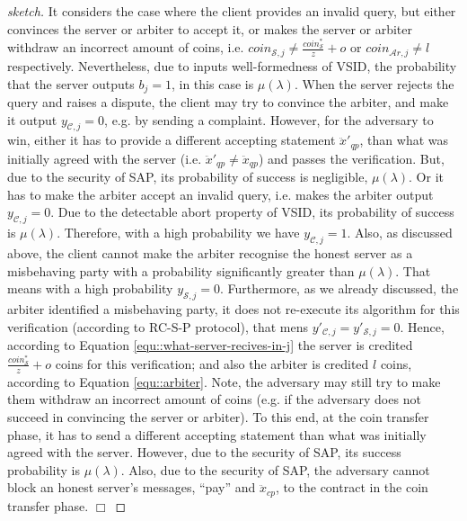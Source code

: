 \begin{proof}[sketch]
       It considers the case where the client provides an invalid query, but  either convinces the server or arbiter to accept it, or  makes the server or arbiter  withdraw an incorrect amount of coins, i.e. $coin_{\scriptscriptstyle\mathcal{S},j}\neq \frac{coin_{\scriptscriptstyle\mathcal S}^{\scriptscriptstyle*}}{z}+o$ or  $coin_{\scriptscriptstyle\mathcal{A}r,j}\neq l$ respectively. Nevertheless, due to inputs well-formedness of VSID, the probability that the server outputs $b_{\scriptscriptstyle j}=1$, in this case is $\mu(\lambda)$. When the server rejects the query and raises a dispute, the client may try to convince the arbiter, and make it output $y_{\scriptscriptstyle \mathcal {C},j}=0$, e.g. by sending a complaint. However, for the adversary to win, either it has to provide a different accepting statement $\ddot{x}'_{\scriptscriptstyle qp}$, than what was initially agreed with the server (i.e. $\ddot{x}'_{\scriptscriptstyle qp}\neq \ddot{x}_{\scriptscriptstyle qp}$) and passes the verification. But,  due to the security of SAP, its probability of success is negligible, $\mu(\lambda)$. Or it has to make the arbiter  accept an invalid query, i.e. makes the arbiter output $y_{\scriptscriptstyle\mathcal{C},j}=0$. Due to the detectable abort property of VSID, its probability of success is  $\mu(\lambda)$. Therefore, with a high probability we have $y_{\scriptscriptstyle\mathcal{C},j}=1$. Also, as discussed above, the client cannot make the arbiter recognise the  honest server as a misbehaving party with a probability significantly greater than $\mu(\lambda)$. That means with a high probability $y_{\scriptscriptstyle\mathcal{S},j}=0$. Furthermore, as we already discussed, the arbiter 
identified a misbehaving party, it does not re-execute its algorithm for this verification (according to RC-S-P protocol),
that mens $y'_{\scriptscriptstyle\mathcal{C},j}=y'_{\scriptscriptstyle\mathcal{S},j}=0$.  Hence, according to Equation \ref{equ::what-server-recives-in-j} the server is credited  $\frac{coin_{\scriptscriptstyle\mathcal S}^{\scriptscriptstyle*}}{z}+o$ coins for this verification; and also the arbiter is credited $l$ coins, according to Equation \ref{equ::arbiter}.  Note,  the adversary may still try to  make them withdraw an incorrect amount of coins (e.g. if the adversary does not succeed in convincing the server or arbiter). To this end, at the coin transfer phase, it has to send a  different accepting statement  than what was initially agreed with the server. However, due to the security of SAP, its  success probability is  $\mu(\lambda)$. Also, due to the security of SAP, the adversary cannot block an honest server's  messages, ``pay'' and $\ddot{x}_{\scriptscriptstyle cp}$, to the contract in the coin transfer phase.
 \hfill\(\Box\)\end{proof}
  
